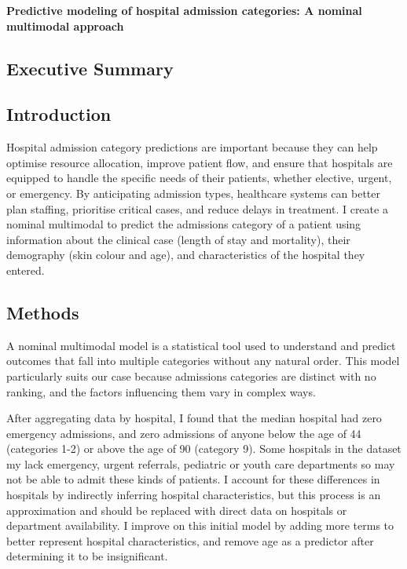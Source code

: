 \documentclass[11pt]{article}
\begin{document}
\begin{titlepage}
    \vspace*{\fill}    
    \begin{center}
        {\Huge \textbf{Predictive modeling of hospital admission categories: A nominal multimodal approach}} \\[1cm]
    \end{center}
    \vspace*{\fill} 
\end{titlepage}

\newpage
\begin{center}
\section*{
        Executive Summary
}
\end{center}

\subsection*{
    Introduction
    \vspace{-0.25cm}
}
Hospital admission category predictions are important because they can help optimise resource allocation, improve patient flow, and ensure that hospitals are equipped to handle the specific needs of their patients, whether elective, urgent, or emergency. By anticipating admission types, healthcare systems can better plan staffing, prioritise critical cases, and reduce delays in treatment. I create a nominal multimodal to predict the admissions category of a patient using information about the clinical case (length of stay and mortality), their demography (skin colour and age), and characteristics of the hospital they entered.

\vspace{-0.5cm}
\subsection*{
    \vspace{-0.25cm}
    Methods
}
A nominal multimodal model is a statistical tool used to understand and predict outcomes that fall into multiple categories without any natural order. This model particularly suits our case because admissions categories are distinct with no ranking, and the factors influencing them vary in complex ways.

After aggregating data by hospital, I found that the median hospital had zero emergency admissions, and zero admissions of anyone below the age of 44 (categories 1-2) or above the age of 90 (category 9). Some hospitals in the dataset my lack emergency, urgent referrals, pediatric or youth care departments so may not be able to admit these kinds of patients. I account for these differences in hospitals by indirectly inferring hospital characteristics, but this process is an approximation and should be replaced with direct data on hospitals or department availability. I improve on this initial model by adding more terms to better represent hospital characteristics, and remove age as a predictor after determining it to be insignificant.
\end{document}
